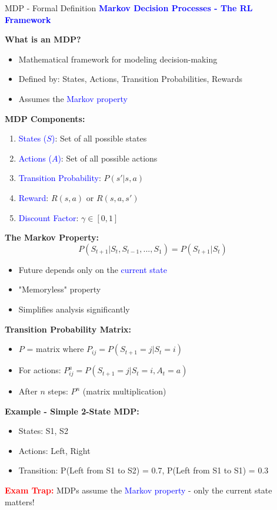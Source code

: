 \documentclass[8pt]{beamer}
\begin{document}
	\begin{frame}{MDP - Formal Definition}
		\fontsize{6.5}{7.5}\selectfont
		\textcolor{blue}{\textbf{Markov Decision Processes - The RL Framework}}
		
		\textbf{What is an MDP?}
		\begin{itemize}
			\item Mathematical framework for modeling decision-making
			\item Defined by: States, Actions, Transition Probabilities, Rewards
			\item Assumes the \textcolor{blue}{Markov property}
		\end{itemize}
		
		\textbf{MDP Components:}
		\begin{enumerate}
			\item \textcolor{blue}{States ($S$)}: Set of all possible states
			\item \textcolor{blue}{Actions ($A$)}: Set of all possible actions
			\item \textcolor{blue}{Transition Probability}: $P(s'|s,a)$
			\item \textcolor{blue}{Reward}: $R(s,a)$ or $R(s,a,s')$
			\item \textcolor{blue}{Discount Factor}: $\gamma \in [0,1]$
		\end{enumerate}
		
		\textbf{The Markov Property:}
		\[
		P(S_{t+1} | S_t, S_{t-1}, ..., S_1) = P(S_{t+1} | S_t)
		\]
		\begin{itemize}
			\item Future depends only on the \textcolor{blue}{current state}
			\item "Memoryless" property
			\item Simplifies analysis significantly
		\end{itemize}
		
		\textbf{Transition Probability Matrix:}
		\begin{itemize}
			\item $P$ = matrix where $P_{ij} = P(S_{t+1} = j | S_t = i)$
			\item For actions: $P^a_{ij} = P(S_{t+1} = j | S_t = i, A_t = a)$
			\item After $n$ steps: $P^n$ (matrix multiplication)
		\end{itemize}
		
		\textbf{Example - Simple 2-State MDP:}
		\begin{itemize}
			\item States: S1, S2
			\item Actions: Left, Right
			\item Transition: P(Left from S1 to S2) = 0.7, P(Left from S1 to S1) = 0.3
		\end{itemize}
		
		\textcolor{red}{\textbf{Exam Trap:}} MDPs assume the \textcolor{blue}{Markov property} - only the current state matters!
	\end{frame}
	
\end{document}
